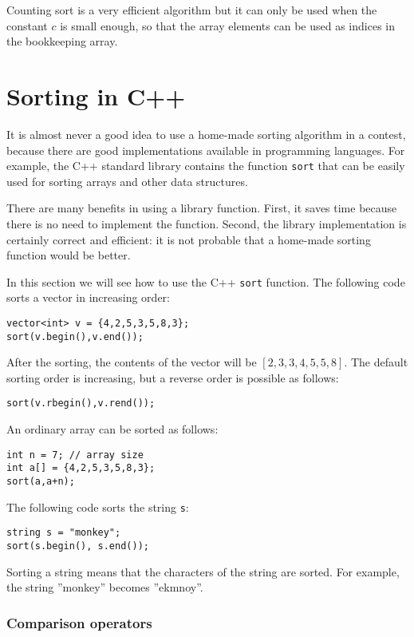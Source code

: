 Counting sort is a very efficient algorithm
but it can only be used when the constant $c$
is small enough, so that the array elements can
be used as indices in the bookkeeping array.

\section{Sorting in C++}


It is almost never a good idea to use
a home-made sorting algorithm
in a contest, because there are good
implementations available in programming languages.
For example, the C++ standard library contains
the function \texttt{sort} that can be easily used for
sorting arrays and other data structures.

There are many benefits in using a library function.
First, it saves time because there is no need to
implement the function.
Second, the library implementation is
certainly correct and efficient: it is not probable
that a home-made sorting function would be better.

In this section we will see how to use the
C++ \texttt{sort} function.
The following code sorts
a vector in increasing order:
\begin{lstlisting}
vector<int> v = {4,2,5,3,5,8,3};
sort(v.begin(),v.end());
\end{lstlisting}
After the sorting, the contents of the
vector will be
$[2,3,3,4,5,5,8]$.
The default sorting order is increasing,
but a reverse order is possible as follows:
\begin{lstlisting}
sort(v.rbegin(),v.rend());
\end{lstlisting}
An ordinary array can be sorted as follows:
\begin{lstlisting}
int n = 7; // array size
int a[] = {4,2,5,3,5,8,3};
sort(a,a+n);
\end{lstlisting}
\newpage
The following code sorts the string \texttt{s}:
\begin{lstlisting}
string s = "monkey";
sort(s.begin(), s.end());
\end{lstlisting}
Sorting a string means that the characters
of the string are sorted.
For example, the string ''monkey'' becomes ''ekmnoy''.

\subsubsection{Comparison operators}

